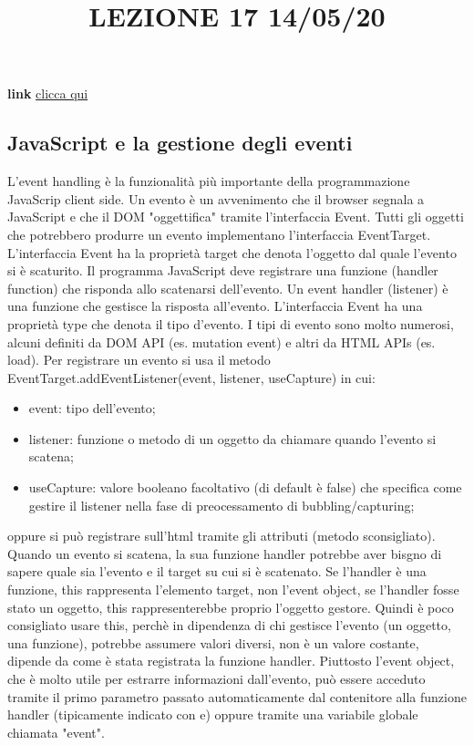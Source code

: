 \title{LEZIONE 17 14/05/20}
\textbf{link} \href{https://web.microsoftstream.com/video/57f59578-62d3-46db-8a0c-63b47c342cf3?list=user&userId=cfe0965d-9a7c-40e2-be6e-f078296a1914}{clicca qui}
\subsection{JavaScript e la gestione degli eventi}
L'event handling è la funzionalità più importante della programmazione JavaScrip client side.\newline
\newline
Un evento è un avvenimento che il browser segnala a JavaScript e che il DOM "oggettifica" tramite l'interfaccia Event. Tutti gli oggetti che potrebbero produrre un evento implementano l'interfaccia EventTarget. L'interfaccia Event ha la proprietà target che denota l'oggetto dal quale l'evento si è scaturito.\newline
\newline
Il programma JavaScript deve registrare una funzione (handler function) che risponda allo scatenarsi dell'evento. Un event handler (listener) è una funzione che gestisce la risposta all'evento.\newline
\newline
L'interfaccia Event ha una proprietà type che denota il tipo d'evento. I tipi di evento sono molto numerosi, alcuni definiti da DOM API (es. mutation event) e altri da HTML APIs (es. load).\newline
\newline
Per registrare un evento si usa il metodo EventTarget.addEventListener(event, listener, useCapture) in cui:
\begin{itemize}
    \item event: tipo dell'evento;
    \item listener: funzione o metodo di un oggetto da chiamare quando l'evento si scatena;
    \item useCapture: valore booleano facoltativo (di default è false) che specifica come gestire il listener nella fase di preocessamento di bubbling/capturing;
\end{itemize}
oppure si può registrare sull'html tramite gli attributi (metodo sconsigliato).
\newline
\newline
Quando un evento si scatena, la sua funzione handler potrebbe aver bisgno di sapere quale sia l'evento e il target su cui si è scatenato. Se l'handler è una funzione, this rappresenta l'elemento target, non l'event object, se l'handler fosse stato un oggetto, this rappresenterebbe proprio l'oggetto gestore. Quindi è poco consigliato usare this, perchè in dipendenza di chi gestisce l'evento (un oggetto, una funzione), potrebbe assumere valori diversi, non è un valore costante, dipende da come è stata registrata la funzione handler. Piuttosto l'event object, che è molto utile per estrarre informazioni dall'evento, può essere acceduto tramite il primo parametro passato automaticamente dal contenitore alla funzione handler (tipicamente indicato con e) oppure tramite una variabile globale chiamata "event".\newline
